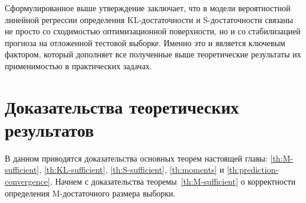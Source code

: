 Сформулированное выше утверждение заключает, что в модели вероятностной линейной регрессии определения KL-достаточности и S-достаточности связаны не просто со сходимостью оптимизационной поверхности, но и со стабилизацией прогноза на отложенной тестовой выборке. Именно это и является ключевым фактором, который дополняет все полученные выше теоретические результаты их применимостью в практических задачах.

\section{Доказательства теоретических результатов}

В данном приводятся доказательства основных теорем настоящей главы: \ref{th:M-sufficient}, \ref{th:KL-sufficient}, \ref{th:S-sufficient}, \ref{th:moments} и \ref{th:prediction-convergence}. Начнем с доказательства теоремы~\ref{th:M-sufficient} о корректности определения M-достаточного размера выборки.

